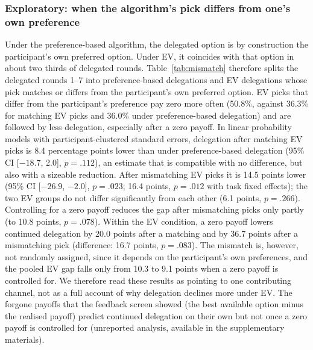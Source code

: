 \documentclass[a4paper, 12pt, fleqn]{article}
\theoremstyle{hypstyle}
\begin{document}
\subsubsection*{Exploratory: when the algorithm's pick differs from one's own preference}
Under the preference-based algorithm, the delegated option is by construction the participant's own preferred option. Under EV, it coincides with that option in about two thirds of delegated rounds. Table~\ref{tab:mismatch} therefore splits the delegated rounds 1--7 into preference-based delegations and EV delegations whose pick matches or differs from the participant's own preferred option. EV picks that differ from the participant's preference pay zero more often (50.8\%, against 36.3\% for matching EV picks and 36.0\% under preference-based delegation) and are followed by less delegation, especially after a zero payoff. In linear probability models with participant-clustered standard errors, delegation after matching EV picks is 8.4 percentage points lower than under preference-based delegation (95\% CI [$-18.7$, 2.0], $p = .112$), an estimate that is compatible with no difference, but also with a sizeable reduction. After mismatching EV picks it is 14.5 points lower (95\% CI [$-26.9$, $-2.0$], $p = .023$; 16.4 points, $p = .012$ with task fixed effects); the two EV groups do not differ significantly from each other (6.1 points, $p = .266$). Controlling for a zero payoff reduces the gap after mismatching picks only partly (to 10.8 points, $p = .078$). Within the EV condition, a zero payoff lowers continued delegation by 20.0 points after a matching and by 36.7 points after a mismatching pick (difference: 16.7 points, $p = .083$). The mismatch is, however, not randomly assigned, since it depends on the participant's own preferences, and the pooled EV gap falls only from 10.3 to 9.1 points when a zero payoff is controlled for. We therefore read these results as pointing to one contributing channel, not as a full account of why delegation declines more under EV. The forgone payoffs that the feedback screen showed (the best available option minus the realised payoff) predict continued delegation on their own but not once a zero payoff is controlled for (unreported analysis, available in the supplementary materials).
\end{document}
